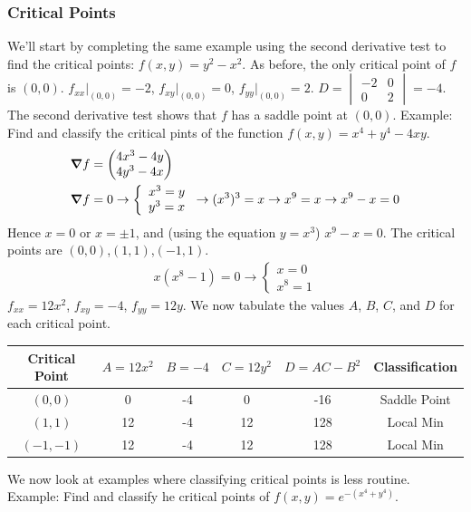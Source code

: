 \documentclass{article}
\newcommand{\n}{\leavevmode \newline} %
\newcommand{\nn}{\leavevmode \newline \newline} %
\numberwithin{equation}{subsection} %
\begin{document}
\subsubsection{Critical Points}
We'll start by completing the same example using the second derivative test to find the critical points: $f(x,y)=y^2-x^2$.
\n
As before, the only critical point of $f$ is $(0,0)$. $f_{xx}|_{(0,0)} = -2$, $f_{xy}|_{(0,0)}=0$, $f_{yy}|_{(0,0)}=2$. $D = \begin{vmatrix}
-2 & 0 \\ 0 & 2
\end{vmatrix} = -4$. The second derivative test shows that $f$ has a saddle point at $(0,0)$.
\nn
Example: Find and classify the critical pints of the function $f(x,y)=x^4+y^4-4xy$.
\begin{equation}
    \begin{split}
        &\grad f =
        \begin{pmatrix}
            4x^3-4y \\ 4y^3-4x
        \end{pmatrix}
        \\
        &\grad f = 0 \to 
        \left\{\begin{array}{ll}
        x^3 = y \\ y^3 = x
        \end{array}\right.
        \to (x^3)^3 = x \to x^9 = x \to x^9-x=0
        \end{split}
\end{equation}
Hence $x=0$ or $x=\pm1$, and (using the equation $y=x^3$) $x^9-x=0$. The critical points are $(0,0)$,$(1,1)$,$(-1,1)$.
\begin{equation}
    \begin{split}
        x(x^8-1)=0 \to
        \left\{
        \begin{array}{ll}
            x=0 \\ x^8 = 1
        \end{array}
        \right.
    \end{split}
\end{equation}
$f_{xx}=12x^2$, $f_{xy}=-4$, $f_{yy}=12y$. We now tabulate the values $A$, $B$, $C$, and $D$ for each critical point.

\begin{table}[H]
    \centering
    \begin{tabular}{c|c|c|c|c|c}
        Critical Point & $A=12x^2$ & $B=-4$ & $C=12y^2$ & $D=AC-B^2$ & Classification \\
        \hline
        $(0,0)$ & 0 & -4 & 0 & -16 & Saddle Point \\
        \hline
        $(1,1)$ & 12 & -4 & 12 & 128 & Local Min \\
        \hline
        $(-1,-1)$ & 12 & -4 & 12 & 128 & Local Min
    \end{tabular}
\end{table}
We now look at examples where classifying critical points is less routine. Example: Find and classify he critical points of $f(x,y)=e^{-(x^4+y^4)}$.
\end{document}
